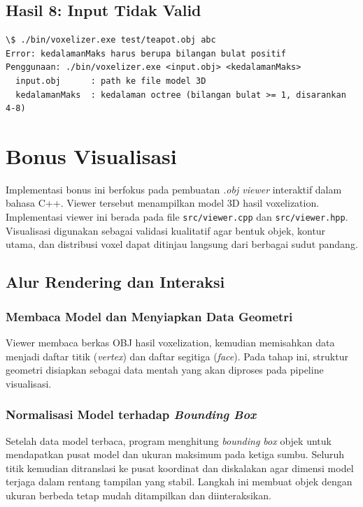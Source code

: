 \documentclass{article}
\begin{document}
\subsection{Hasil 8: Input Tidak Valid}

\begin{lstlisting}[style=bashstyle, caption={Output terminal input tidak valid}, captionpos=t]
\$ ./bin/voxelizer.exe test/teapot.obj abc
Error: kedalamanMaks harus berupa bilangan bulat positif
Penggunaan: ./bin/voxelizer.exe <input.obj> <kedalamanMaks>
  input.obj      : path ke file model 3D
  kedalamanMaks  : kedalaman octree (bilangan bulat >= 1, disarankan 4-8)

\end{lstlisting}

\clearpage
\section{Bonus Visualisasi}

Implementasi bonus ini berfokus pada pembuatan \textit{.obj viewer} interaktif
dalam bahasa C++. Viewer tersebut menampilkan model 3D hasil voxelization.
Implementasi viewer ini berada pada file \texttt{src/viewer.cpp} dan \texttt{src/viewer.hpp}.
Visualisasi digunakan sebagai validasi kualitatif agar bentuk objek,
kontur utama, dan distribusi voxel dapat ditinjau langsung dari berbagai
sudut pandang.

\subsection{Alur Rendering dan Interaksi}

\subsubsection{Membaca Model dan Menyiapkan Data Geometri}

Viewer membaca berkas OBJ hasil voxelization, kemudian memisahkan data menjadi daftar titik
(\textit{vertex}) dan daftar segitiga (\textit{face}). Pada tahap ini, struktur geometri disiapkan
sebagai data mentah yang akan diproses pada pipeline visualisasi.

\subsubsection{Normalisasi Model terhadap \textit{Bounding Box}}

Setelah data model terbaca, program menghitung \textit{bounding box} objek untuk mendapatkan
pusat model dan ukuran maksimum pada ketiga sumbu. Seluruh titik kemudian ditranslasi ke pusat
koordinat dan diskalakan agar dimensi model terjaga dalam rentang tampilan yang stabil.
Langkah ini membuat objek dengan ukuran berbeda tetap mudah ditampilkan dan diinteraksikan.
\end{document}
